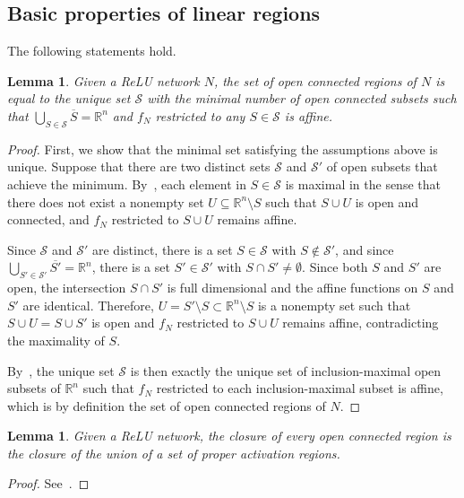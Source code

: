 \documentclass{article}
\newtheorem{lemma}[theorem]{Lemma}
\begin{document}
\subsection{Basic properties of linear regions}
The following statements hold.
\begin{lemma}
\label{lem:open_connected_regions_are_well_defined}
    Given a ReLU network $N$, the set of open connected regions of $N$ is equal to the unique set $\mathcal{S}$ with the minimal number of open connected subsets such that $\bigcup_{S\in \mathcal{S}}\overline{S}=\mathbb{R}^n$ and $f_N$ restricted to any $S\in \mathcal{S}$ is affine.
\end{lemma}
\begin{proof}
    First, we show that the minimal set satisfying the assumptions above is unique.
    Suppose that there are two distinct sets $\mathcal{S}$ and $\mathcal{S}'$ of open subsets that achieve the minimum.
    By~\citet[Lemma 3.2]{zanotti2025bounds}, each element in $S\in \mathcal{S}$ is maximal in the sense that there does not exist a nonempty set $U\subseteq \mathbb{R}^n\setminus S$ such that $S\cup U$ is open and connected, and $f_N$ restricted to $S\cup U$ remains affine.
    
    Since $\mathcal{S}$ and $\mathcal{S}'$ are distinct, there is a set $S\in \mathcal{S}$ with $S\notin \mathcal{S}'$, and since $\bigcup_{S'\in \mathcal{S}'}\overline{S'}=\mathbb{R}^n$, there is a set $S'\in \mathcal{S}'$ with $S\cap S'\neq \emptyset$.
    Since both $S$ and $S'$ are open, the intersection $S\cap S'$ is full dimensional and the affine functions on $S$ and $S'$ are identical.
    Therefore, $U=S'\setminus S\subset \mathbb{R}^n \setminus S$ is a nonempty set such that $S\cup U=S\cup S'$ is open and $f_N$ restricted to $S\cup U$ remains affine, contradicting the maximality of $S$.

    By~\citet[Lemma 3.2]{zanotti2025bounds}, the unique set $\mathcal{S}$ is then exactly the unique set of inclusion-maximal open subsets of $\mathbb{R}^n$ such that $f_N$ restricted to each inclusion-maximal subset is affine, which is by definition the set of open connected regions of $N$.
\end{proof}
\begin{lemma}
\label{lem:open_connected_region_is_made_up_of_proper_activation_regions}
    Given a ReLU network, the closure of every open connected region is the closure of the union of a set of proper activation regions.
\end{lemma}
\begin{proof}
    See~\citet[Lemma 3]{hanin2019deep}.
\end{proof}
\end{document}
